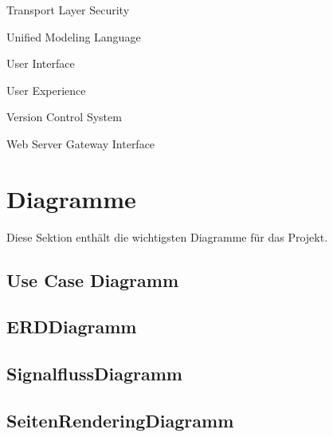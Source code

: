 \documentclass[a4paper,12pt,ngerman]{sphinxmanual}
\begin{document}
\sphinxAtStartPar
{}
Transport Layer Security

\sphinxAtStartPar
{}
Unified Modeling Language

\sphinxAtStartPar
{}
User Interface

\sphinxAtStartPar
{}
User Experience

\sphinxAtStartPar
{}
Version Control System

\sphinxAtStartPar
{}
Web Server Gateway Interface

\sphinxstepscope


\section{Diagramme}
\label{\detokenize{sections/diagramme:diagramme}}\label{\detokenize{sections/diagramme::doc}}
\sphinxAtStartPar
Diese Sektion enthält die wichtigsten Diagramme für das Projekt.


\subsection{Use Case Diagramm}
\label{\detokenize{sections/diagramme:use-case-diagramm}}\label{\detokenize{sections/diagramme:use-case-diagram}}
\noindent{}


\subsection{ERD\sphinxhyphen{}Diagramm}
\label{\detokenize{sections/diagramme:erd-diagramm}}\label{\detokenize{sections/diagramme:erd-diagram}}
\noindent{}


\subsection{Signalfluss\sphinxhyphen{}Diagramm}
\label{\detokenize{sections/diagramme:signalfluss-diagramm}}\label{\detokenize{sections/diagramme:signal-flow-diagram}}
\noindent{}


\subsection{Seiten\sphinxhyphen{}Rendering\sphinxhyphen{}Diagramm}
\label{\detokenize{sections/diagramme:seiten-rendering-diagramm}}\label{\detokenize{sections/diagramme:page-rendering-diagram}}
\noindent{}
\end{document}
